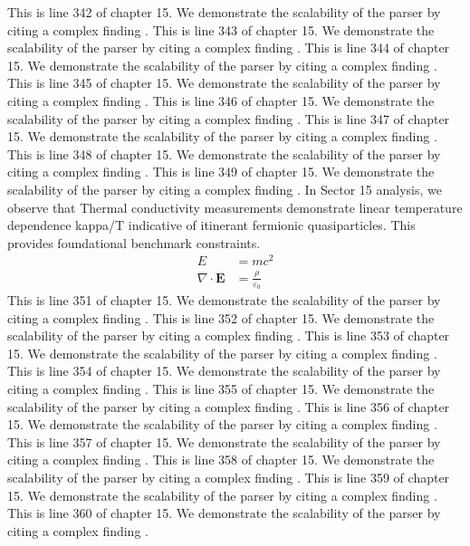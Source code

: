 This is line 342 of chapter 15. We demonstrate the scalability of the parser by citing a complex finding \cite{ref15_342}.
This is line 343 of chapter 15. We demonstrate the scalability of the parser by citing a complex finding \cite{ref15_343}.
This is line 344 of chapter 15. We demonstrate the scalability of the parser by citing a complex finding \cite{ref15_344}.
This is line 345 of chapter 15. We demonstrate the scalability of the parser by citing a complex finding \cite{ref15_345}.
This is line 346 of chapter 15. We demonstrate the scalability of the parser by citing a complex finding \cite{ref15_346}.
This is line 347 of chapter 15. We demonstrate the scalability of the parser by citing a complex finding \cite{ref15_347}.
This is line 348 of chapter 15. We demonstrate the scalability of the parser by citing a complex finding \cite{ref15_348}.
This is line 349 of chapter 15. We demonstrate the scalability of the parser by citing a complex finding \cite{ref15_349}.
In Sector 15 analysis, we observe that Thermal conductivity measurements demonstrate linear temperature dependence kappa/T indicative of itinerant fermionic quasiparticles. This provides foundational benchmark constraints.
\begin{align*}
  E &= mc^2 \\
  \nabla \cdot \mathbf{E} &= \frac{\rho}{\varepsilon_0}
\end{align*}
This is line 351 of chapter 15. We demonstrate the scalability of the parser by citing a complex finding \cite{ref15_351}.
This is line 352 of chapter 15. We demonstrate the scalability of the parser by citing a complex finding \cite{ref15_352}.
This is line 353 of chapter 15. We demonstrate the scalability of the parser by citing a complex finding \cite{ref15_353}.
This is line 354 of chapter 15. We demonstrate the scalability of the parser by citing a complex finding \cite{ref15_354}.
This is line 355 of chapter 15. We demonstrate the scalability of the parser by citing a complex finding \cite{ref15_355}.
This is line 356 of chapter 15. We demonstrate the scalability of the parser by citing a complex finding \cite{ref15_356}.
This is line 357 of chapter 15. We demonstrate the scalability of the parser by citing a complex finding \cite{ref15_357}.
This is line 358 of chapter 15. We demonstrate the scalability of the parser by citing a complex finding \cite{ref15_358}.
This is line 359 of chapter 15. We demonstrate the scalability of the parser by citing a complex finding \cite{ref15_359}.
This is line 360 of chapter 15. We demonstrate the scalability of the parser by citing a complex finding \cite{ref15_360}.
